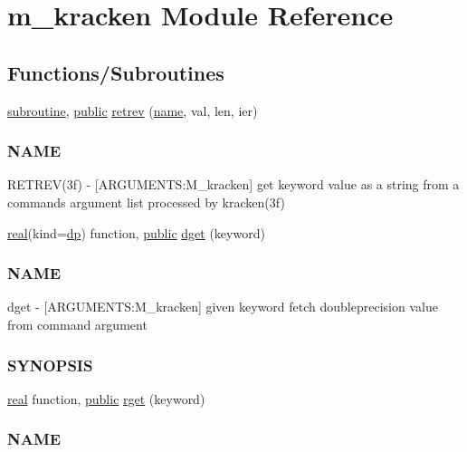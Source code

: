 \hypertarget{namespacem__kracken}{}\section{m\+\_\+kracken Module Reference}
\label{namespacem__kracken}
\subsection*{Functions/\+Subroutines}
\begin{DoxyCompactItemize}
\item 
\hyperlink{M__stopwatch_83_8txt_acfbcff50169d691ff02d4a123ed70482}{subroutine}, \hyperlink{M__stopwatch_83_8txt_a2f74811300c361e53b430611a7d1769f}{public} \hyperlink{namespacem__kracken_ad4f3d7c793c90789b175097b433035da}{retrev} (\hyperlink{M__stopwatch_83_8txt_a3f508a893ae4c3b397b4383e33b9bcae}{name}, val, len, ier)
\begin{DoxyCompactList}\small\item\em \subsubsection*{N\+A\+ME}

R\+E\+T\+R\+E\+V(3f) -\/ \mbox{[}A\+R\+G\+U\+M\+E\+N\+TS\+:M\+\_\+kracken\mbox{]} get keyword value as a string from a command\textquotesingle{}s argument list processed by kracken(3f) \end{DoxyCompactList}\item 
\hyperlink{read__watch_83_8txt_abdb62bde002f38ef75f810d3a905a823}{real}(kind=\hyperlink{namespacem__kracken_a1de91e5ca55bf4fab118936bf4fad36a}{dp}) function, \hyperlink{M__stopwatch_83_8txt_a2f74811300c361e53b430611a7d1769f}{public} \hyperlink{namespacem__kracken_ae7b6ad046d637f03148efb56336a7ff4}{dget} (keyword)
\begin{DoxyCompactList}\small\item\em \subsubsection*{N\+A\+ME}

dget -\/ \mbox{[}A\+R\+G\+U\+M\+E\+N\+TS\+:M\+\_\+kracken\mbox{]} given keyword fetch doubleprecision value from command argument \subsubsection*{S\+Y\+N\+O\+P\+S\+IS}\end{DoxyCompactList}\item 
\hyperlink{read__watch_83_8txt_abdb62bde002f38ef75f810d3a905a823}{real} function, \hyperlink{M__stopwatch_83_8txt_a2f74811300c361e53b430611a7d1769f}{public} \hyperlink{namespacem__kracken_a21e0e40932af79430832a53bdb4de300}{rget} (keyword)
\begin{DoxyCompactList}\small\item\em \subsubsection*{N\+A\+ME}


\end{DoxyCompactList}
\end{DoxyCompactItemize}
